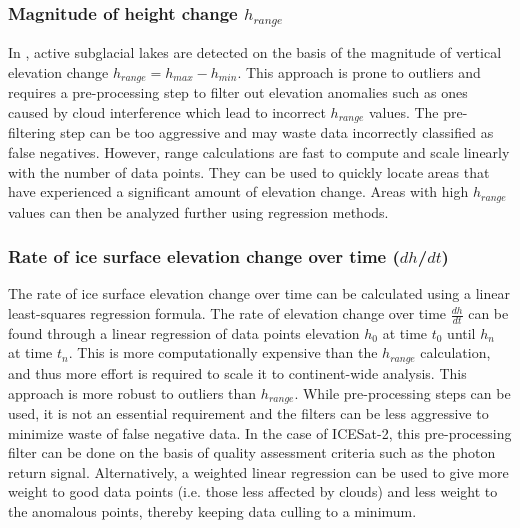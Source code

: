 \subsubsection{Magnitude of height change $h_{range}$}

In \citet{Smithinventoryactivesubglacial2009,SiegfriedThirteenyearssubglacial2018}, active subglacial lakes are detected on the basis of the magnitude of vertical elevation change $h_{range} = h_{max} - h_{min}$.
This approach is prone to outliers and requires a pre-processing step to filter out elevation anomalies such as ones caused by cloud interference which lead to incorrect $h_{range}$ values.
The pre-filtering step can be too aggressive and may waste data incorrectly classified as false negatives.
However, range calculations are fast to compute and scale linearly with the number of data points.
They can be used to quickly locate areas that have experienced a significant amount of elevation change.
Areas with high $h_{range}$ values can then be analyzed further using regression methods.

\subsubsection{Rate of ice surface elevation change over time ($dh$/$dt$)}

The rate of ice surface elevation change over time can be calculated using a linear least-squares regression formula.
The rate of elevation change over time $\frac{dh}{dt}$ can be found through a linear regression of data points elevation $h_0$ at time $t_0$ until $h_n$ at time $t_n$.
This is more computationally expensive than the $h_{range}$ calculation, and thus more effort is required to scale it to continent-wide analysis.
This approach is more robust to outliers than $h_{range}$.
While pre-processing steps can be used, it is not an essential requirement and the filters can be less aggressive to minimize waste of false negative data.
In the case of ICESat-2, this pre-processing filter can be done on the basis of quality assessment criteria such as the photon return signal.
Alternatively, a weighted linear regression can be used to give more weight to good data points (i.e. those less affected by clouds) and less weight to the anomalous points, thereby keeping data culling to a minimum.

